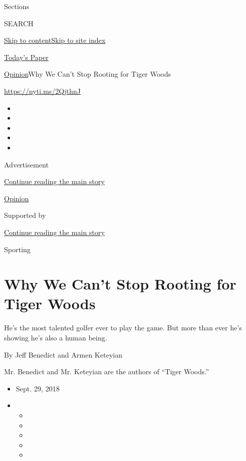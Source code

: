 Sections

SEARCH

\protect\hyperlink{site-content}{Skip to
content}\protect\hyperlink{site-index}{Skip to site index}

\href{https://myaccount.nytimes.com/auth/login?response_type=cookie\&client_id=vi}{}

\href{https://www.nytimes.com/section/todayspaper}{Today's Paper}

\href{/section/opinion}{Opinion}\textbar{}Why We Can't Stop Rooting for
Tiger Woods

\href{https://nyti.ms/2QjthnJ}{https://nyti.ms/2QjthnJ}

\begin{itemize}
\item
\item
\item
\item
\item
\end{itemize}

Advertisement

\protect\hyperlink{after-top}{Continue reading the main story}

\href{/section/opinion}{Opinion}

Supported by

\protect\hyperlink{after-sponsor}{Continue reading the main story}

Sporting

\hypertarget{why-we-cant-stop-rooting-for-tiger-woods}{%
\section{Why We Can't Stop Rooting for Tiger
Woods}\label{why-we-cant-stop-rooting-for-tiger-woods}}

He's the most talented golfer ever to play the game. But more than ever
he's showing he's also a human being.

By Jeff Benedict and Armen Keteyian

Mr. Benedict and Mr. Keteyian are the authors of ``Tiger Woods.''

\begin{itemize}
\item
  Sept. 29, 2018
\item
  \begin{itemize}
  \item
  \item
  \item
  \item
  \item
  \end{itemize}
\end{itemize}

